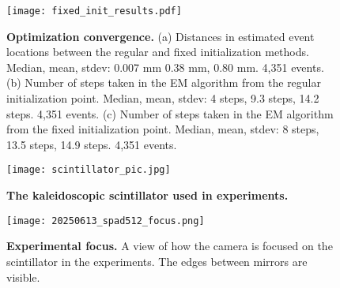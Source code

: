 \documentclass{article}
\begin{document}
\begin{figure*}
\centering
\texttt{[image: fixed\_init\_results.pdf]}
\caption{\textbf{Optimization convergence.}
(a) Distances in estimated event locations between the regular and fixed initialization methods. Median, mean, stdev: 0.007 mm 0.38 mm, 0.80 mm. 4,351 events.
(b) Number of steps taken in the EM algorithm from the regular initialization point. Median, mean, stdev: 4 steps, 9.3 steps, 14.2 steps. 4,351 events.
(c) Number of steps taken in the EM algorithm from the fixed initialization point. Median, mean, stdev: 8 steps, 13.5 steps, 14.9 steps. 4,351 events.
} 
\label{fig:convergence}
\end{figure*}


\begin{figure}
\centering
\texttt{[image: scintillator\_pic.jpg]}
\caption{\textbf{The kaleidoscopic scintillator used in experiments.}}
\label{fig:scintillator}
\end{figure}

\iffalse
\begin{figure}
\centering
\texttt{[image: setup\_pic.jpg]}
\caption{The experimental setup without the gamma-ray source.} 
\label{fig:setup}
\end{figure}
\fi

\begin{figure}
\centering
\texttt{[image: 20250613\_spad512\_focus.png]}
\caption{\textbf{Experimental focus.} A view of how the camera is focused on the scintillator in the experiments. The edges between mirrors are visible.} 
\label{fig:experiment_focus}
\end{figure}
\end{document}

